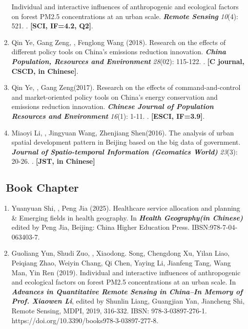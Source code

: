 \begin{enumerate}
	Individual and interactive influences of anthropogenic and ecological factors on forest PM2.5 concentrations at an urban scale.
    \textbf{\textit{Remote Sensing}} \textit{10}(4): 521.
    . \textbf{[SCI, IF=4.2, Q2]}.
\item
    Qin Ye, Gang Zeng\CS, \Shaoqing, Fenglong Wang (2018).
	Research on the effects of different policy tools on China’s emissions reduction innovation.
    \textbf{\textit{China Population, Resources and Environment}} \textit{28}(02): 115-122.
    . \textbf{[C journal, CSCD, in Chinese]}.
\item
    Qin Ye, \Shaoqing, Gang Zeng\CS (2017).
	Research on the effects of command-and-control and market-oriented policy tools on China’s energy conservation and emissions reduction innovation.
    \textbf{\textit{Chinese Journal of Population Resources and Environment}} \textit{16}(1): 1-11.
    . \textbf{[ESCI, IF=3.9]}.
\item
    Miaoyi Li, \Shaoqing, Jingyuan Wang, Zhenjiang Shen\CS (2016).
	The analysis of urban spatial development pattern in Beijing based on the big data of government.
    \textbf{\textit{Journal of Spatio-temporal Information (Geomatics World)}} \textit{23}(3): 20-26.
    . \textbf{[JST, in Chinese]}
\end{enumerate}

\subsection*{\texorpdfstring{\faBook\ Book Chapter}{Book Chapter}}
\begin{enumerate}
\item
    Yuanyuan Shi, \Shaoqing, Peng Jia (2025).
    Healthcare service allocation and planning \& Emerging fields in health geography. 
    In \textbf{\textit{Health Geography(in Chinese)}} edited by Peng Jia, Beijing: China Higher Education Press. 
    IBSN:978-7-04-063403-7. 
\item
    Guoliang Yun, Shudi Zuo, \Shaoqing, Xiaodong. Song, Chengdong Xu, Yilan Liao, Peiqiang Zhao, Weiyin Chang, Qi Chen, Yaying Li, Jianfeng Tang, Wang Man, Yin Ren (2019).
	Individual and interactive influences of anthropogenic and ecological factors on forest PM2.5 concentrations at an urban scale. 
    In \textbf{\textit{Advances in Quantitative Remote Sensing in China–In Memory of Prof. Xiaowen Li}}, 
    edited by Shunlin Liang, Guangjian Yan, Jiancheng Shi, Remote Sensing, MDPI, 2019, 316-332. IBSN: 978-3-03897-276-1.
    https://doi.org/10.3390/books978-3-03897-277-8. 
\end{enumerate}

